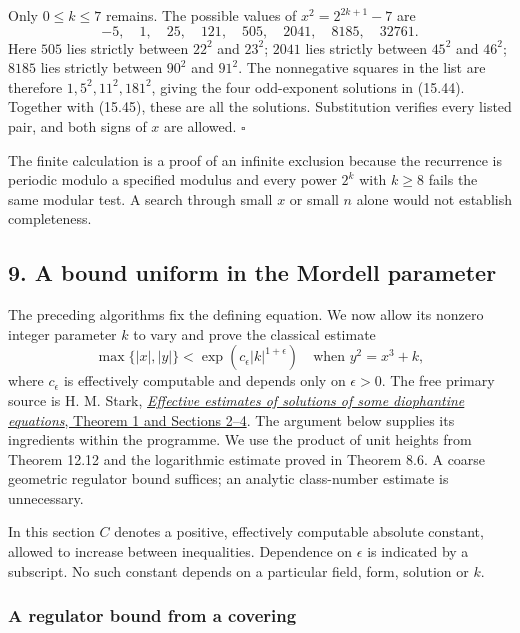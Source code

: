 \documentclass[
  11pt,
  a4paper,
]{article}
\begin{document}
Only \(0\le k\le7\) remains. The possible values of \(x^2=2^{2k+1}-7\)
are \[
-5,\quad1,\quad25,\quad121,\quad505,\quad2041,\quad
8185,\quad32761.
\tag{15.56}
\] Here \(505\) lies strictly between \(22^2\) and \(23^2\); \(2041\)
lies strictly between \(45^2\) and \(46^2\); \(8185\) lies strictly
between \(90^2\) and \(91^2\). The nonnegative squares in the list are
therefore \(1,5^2,11^2,181^2\), giving the four odd-exponent solutions
in (15.44). Together with (15.45), these are all the solutions.
Substitution verifies every listed pair, and both signs of \(x\) are
allowed. \(\square\)

The finite calculation is a proof of an infinite exclusion because the
recurrence is periodic modulo a specified modulus and every power
\(2^k\) with \(k\ge8\) fails the same modular test. A search through
small \(x\) or small \(n\) alone would not establish completeness.

\subsection{9. A bound uniform in the Mordell
parameter}\label{a-bound-uniform-in-the-mordell-parameter}

The preceding algorithms fix the defining equation. We now allow its
nonzero integer parameter \(k\) to vary and prove the classical estimate
\[
\max\{|x|,|y|\}<\exp(c_\epsilon |k|^{1+\epsilon})
\quad\text{when }y^2=x^3+k,
\] where \(c_\epsilon\) is effectively computable and depends only on
\(\epsilon>0\). The free primary source is H. M. Stark,
\href{https://www.impan.pl/shop/en/publication/transaction/download/product/98735}{\emph{Effective
estimates of solutions of some diophantine equations}, Theorem 1 and
Sections 2--4}. The argument below supplies its ingredients within the
programme. We use the product of unit heights from Theorem 12.12 and the
logarithmic estimate proved in Theorem 8.6. A coarse geometric regulator
bound suffices; an analytic class-number estimate is unnecessary.

In this section \(C\) denotes a positive, effectively computable
absolute constant, allowed to increase between inequalities. Dependence
on \(\epsilon\) is indicated by a subscript. No such constant depends on
a particular field, form, solution or \(k\).

\subsubsection{A regulator bound from a
covering}\label{a-regulator-bound-from-a-covering}
\end{document}
